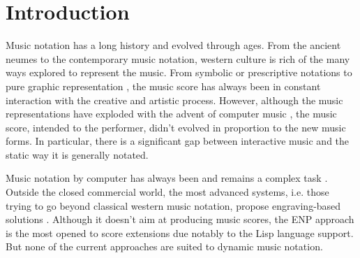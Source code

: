 \documentclass[twoside,10pt]{article}
\affiliation{\paperauthorA, \paperauthorB, \paperauthorC, \paperauthorD}
  {Grame\\ Centre national de cr\'eation musicale, Lyon, France \\ 
  {\tt{{\small \{fober,daudin,orlarey,letz\}@grame.fr}}}}
\title{\papertitle}
\begin{document}
    
\maketitle

\begin{abstract}
We propose a simple method for synchronization of arbitrary graphic objects, based on their time relations.
This method relies on \emph{segmentation} and \emph{mappings} that are \emph{relations} between segmentations. 
The paper gives a formal description of \emph{segmentations} and \emph{mappings} and presents 
"Interlude", a framework that implements the proposed method under the form of an \emph{augmented music score viewer}, opening a new space to music notation.
\end{abstract}

\section{Introduction}\label{sec:introduction}

Music notation has a long history and evolved through ages. From the ancient neumes to the contemporary music notation, western culture is rich of the many ways explored to represent the music. From symbolic or prescriptive notations to pure graphic representation \cite{brown}, the music score has always been in constant interaction with the creative and artistic process. 
However, although the music representations have exploded with the advent of computer music \cite{dann93b,selfridge-field97,hewlett01}, the music score, intended to the performer, didn't evolved in proportion to the new music forms. In particular, there is a significant gap between interactive music and the static way it is generally notated.

Music notation by computer has always been and remains a complex task \cite{BIRD84}. Outside the closed commercial world, the most advanced systems, i.e. those trying to go beyond classical western music notation, propose engraving-based solutions \cite{Hamel98,lilypond03}. Although it doesn't aim at producing music scores, the ENP approach \cite{KUUSK06} is the most opened to score extensions due notably to the Lisp language support. But none of the current approaches are suited to dynamic music notation.
\end{document}
